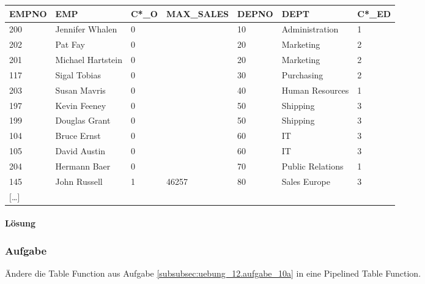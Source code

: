 \begin{table}[H]
  \centering
  \small
  \begin{tabular}{|l|l|l|l|l|l|l|}
    \hline
    EMPNO        & EMP               & C*\_O & MAX\_SALES & DEPNO & DEPT             & C*\_ED \\
    \hline
     200         & Jennifer Whalen   & 0     &            & 10    & Administration   & 1 \\
     202         & Pat Fay           & 0     &            & 20    & Marketing        & 2 \\
     201         & Michael Hartstein & 0     &            & 20    & Marketing        & 2 \\
     117         & Sigal Tobias      & 0     &            & 30    & Purchasing       & 2 \\
     203         & Susan Mavris      & 0     &            & 40    & Human Resources  & 1 \\
     197         & Kevin Feeney      & 0     &            & 50    & Shipping         & 3 \\
     199         & Douglas Grant     & 0     &            & 50    & Shipping         & 3 \\
     104         & Bruce Ernst       & 0     &            & 60    & IT               & 3 \\
     105         & David Austin      & 0     &            & 60    & IT               & 3 \\
     204         & Hermann Baer      & 0     &            & 70    & Public Relations & 1 \\
     145         & John Russell      & 1     & 46257      & 80    & Sales Europe     & 3 \\
     $[$\dots$]$ &                   &       &            &       &                  & \\
     \hline
  \end{tabular}
\end{table}

\paragraph*{Lösung}
\label{subsubsec:uebung_12.aufgabe_10a.loesung}

\subsubsection{Aufgabe}
\label{subsec:uebung_12.aufgabe_10b}
Ändere die Table Function aus Aufgabe \ref{subsubsec:uebung_12.aufgabe_10a} in eine Pipelined Table Function.

